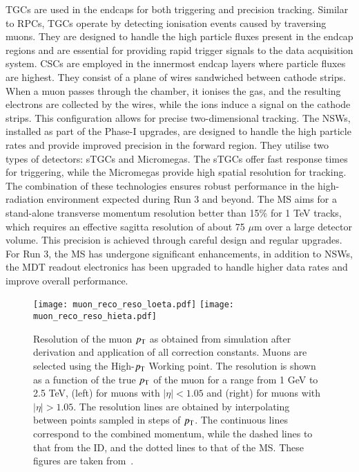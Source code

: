         TGCs are used in the endcaps for both triggering and precision tracking. Similar to RPCs, 
        TGCs operate by detecting ionisation events caused by traversing muons. They are designed to 
        handle the high particle fluxes present in the endcap regions and are essential for providing 
        rapid trigger signals to the data acquisition system.    
        CSCs are employed in the innermost endcap layers where particle fluxes are highest. They 
        consist of a plane of wires sandwiched between cathode strips. When a muon passes through 
        the chamber, it ionises the gas, and the resulting electrons are collected by the wires, 
        while the ions induce a signal on the cathode strips. This configuration allows for precise 
        two-dimensional tracking.
        The NSWs, installed as part of the Phase-I upgrades, are designed to handle the high particle 
        rates and provide improved precision in the forward region. They utilise two types of 
        detectors: sTGCs and Micromegas. The sTGCs offer fast response times for triggering, while 
        the Micromegas provide high spatial resolution for tracking. The combination of these 
        technologies ensures robust performance in the high-radiation environment expected during Run 
        3 and beyond.
        The MS aims for a stand-alone transverse momentum resolution better than 15\% for 1 TeV tracks, 
        which requires an effective sagitta resolution of about 75 \(\mu\)m over a large detector volume. 
        This precision is achieved through careful design and regular upgrades. For Run 3, the MS has 
        undergone significant enhancements, in addition to NSWs, the MDT readout electronics has been upgraded
        to handle higher data rates and improve overall performance.
        \begin{figure}[htbp]
            \centering
            \texttt{[image: muon\_reco\_reso\_loeta.pdf]}
            \texttt{[image: muon\_reco\_reso\_hieta.pdf]}
            \caption{
                Resolution of the muon $p_{\text{T}}$ as obtained from simulation after derivation and application of all correction constants. 
                Muons are selected using the High-$p_{\text{T}}$ Working point. 
                The resolution is shown as a function of the true $p_{\text{T}}$ of the muon for a range from 1 GeV to 2.5 TeV, 
                (left) for muons with $|\eta|<1.05$ and (right) for muons with $|\eta|>1.05$. 
                The resolution lines are obtained by interpolating between points sampled in steps of $p_{\text{T}}$. 
                The continuous lines correspond to the combined momentum, while the dashed lines to that from the ID, and the dotted lines to that of the MS.
                These figures are taken from~\cite{MUON-2022-01}.
            }
            \label{fig:muon_reso}
        \end{figure}
    
